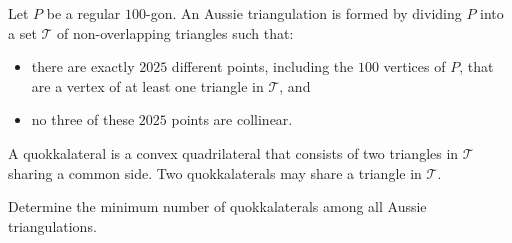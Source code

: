Let $P$ be a regular $100$-gon. An Aussie triangulation is formed by dividing $P$ into a set $\mathcal{T}$ of non-overlapping triangles such that:
\begin{itemize}
\item there are exactly $2025$ different points, including the $100$ vertices of $P$, that are a vertex of at least one triangle in $\mathcal{T}$, and
\item no three of these $2025$ points are collinear.
\end{itemize}
A quokkalateral is a convex quadrilateral that consists of two triangles in $\mathcal{T}$ sharing a common side. Two quokkalaterals may share a triangle in $\mathcal{T}$.

Determine the minimum number of quokkalaterals among all Aussie triangulations.
